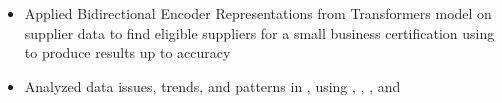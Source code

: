 {\begin{rSection}{}
 \href{https://www.tealbook.com/}{} \hfill {}
\begin{itemize}
    \itemsep -4pt {} 
    \item Applied Bidirectional Encoder Representations from Transformers  model on supplier data to find eligible suppliers for a small business certification using  to produce results up to  accuracy 
    \item Analyzed data issues, trends, and patterns in , using , , , and 
\end{itemize}
\end{rSection}
}